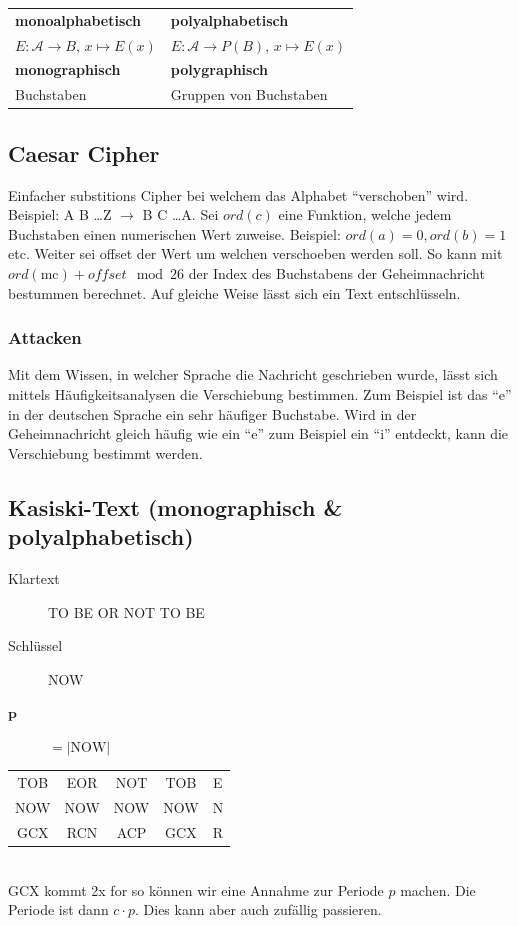 \documentclass[landscape,twocolumn,a4paper]{article}
\newcommand{\Pota}{\mathcal{A}}
\newcommand{\Bold}[1]{\textbf{#1}} %
\newcommand{\T}[1]{\text{#1}} %
\newcommand{\ra}{\rightarrow}
\newcommand{\Abs}[1]{\left| #1 \right|} %
\begin{document}
\begin{tabular}{l|l}
 \Bold{monoalphabetisch}&\Bold{polyalphabetisch}\\
 $E:\Pota\ra B$, $x\mapsto E(x)$&$E:\Pota\ra P(B)$, $x\mapsto E(x)$\\\hline
 \Bold{monographisch}&\Bold{polygraphisch}\\
 Buchstaben&Gruppen von Buchstaben
\end{tabular}

\subsection{Caesar Cipher}
Einfacher substitions Cipher bei welchem das Alphabet ``verschoben'' wird. Beispiel: A B \ldots Z $\rightarrow$ B C \ldots A. Sei $ord(c)$ eine Funktion, welche jedem Buchstaben einen numerischen Wert zuweise. Beispiel: $ord(a) = 0, ord(b) = 1$ etc. Weiter sei offset der Wert um welchen verschoeben werden soll. So kann mit $ord(\text{mc}) + offset \mod 26$ der Index des Buchstabens der Geheimnachricht bestummen berechnet. Auf gleiche Weise lässt sich ein Text entschlüsseln.

\subsubsection{Attacken}
Mit dem Wissen, in welcher Sprache die Nachricht geschrieben wurde, lässt sich mittels Häufigkeitsanalysen die Verschiebung bestimmen. Zum Beispiel ist das ``e'' in der deutschen Sprache ein sehr häufiger Buchstabe. Wird in der Geheimnachricht gleich häufig wie ein ``e'' zum Beispiel ein ``i'' entdeckt, kann die Verschiebung bestimmt werden.

\subsection{Kasiski-Text (monographisch \& polyalphabetisch)}
\begin{description}
	\item[Klartext] TO BE OR NOT TO BE
	\item[Schlüssel] NOW
	\item[$\mathbf{p}$] $=\Abs{\T{NOW}}$
\end{description}
\begin{tabular}{c|c|c|c|c}
 TOB&EOR&NOT&TOB&E\\
 NOW&NOW&NOW&NOW&N\\
 GCX&RCN&ACP&GCX&R
\end{tabular}\\
GCX kommt 2x for so können wir eine Annahme zur Periode $p$ machen. Die Periode ist dann $c\cdot p$. Dies kann aber auch zufällig passieren.
\end{document}
